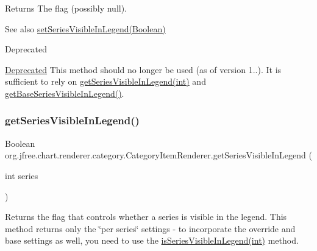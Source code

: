 \begin{DoxyReturn}{Returns}
The flag (possibly {\ttfamily null}).
\end{DoxyReturn}
\begin{DoxySeeAlso}{See also}
\mbox{\hyperlink{interfaceorg_1_1jfree_1_1chart_1_1renderer_1_1category_1_1_category_item_renderer_a2deadd4021ffd277afe59346746efd08}{set\+Series\+Visible\+In\+Legend(\+Boolean)}}
\end{DoxySeeAlso}
\begin{DoxyRefDesc}{Deprecated}
\item[\mbox{\hyperlink{deprecated__deprecated000156}{Deprecated}}]This method should no longer be used (as of version 1..). It is sufficient to rely on \mbox{\hyperlink{interfaceorg_1_1jfree_1_1chart_1_1renderer_1_1category_1_1_category_item_renderer_aece9d12305e2ae6e3ef96d3981574810}{get\+Series\+Visible\+In\+Legend(int)}} and \mbox{\hyperlink{interfaceorg_1_1jfree_1_1chart_1_1renderer_1_1category_1_1_category_item_renderer_a5dbb34f875d6bbd46e99e3ec0d06f27c}{get\+Base\+Series\+Visible\+In\+Legend()}}. \end{DoxyRefDesc}
\mbox{\label{interfaceorg_1_1jfree_1_1chart_1_1renderer_1_1category_1_1_category_item_renderer_aece9d12305e2ae6e3ef96d3981574810}} 
\subsubsection{\texorpdfstring{get\+Series\+Visible\+In\+Legend()}{getSeriesVisibleInLegend()}\hspace{0.1cm}{\footnotesize\ttfamily [2/2]}}
{\footnotesize\ttfamily Boolean org.\+jfree.\+chart.\+renderer.\+category.\+Category\+Item\+Renderer.\+get\+Series\+Visible\+In\+Legend (\begin{DoxyParamCaption}\item[{int}]{series }\end{DoxyParamCaption})}

Returns the flag that controls whether a series is visible in the legend. This method returns only the \char`\"{}per series\char`\"{} settings -\/ to incorporate the override and base settings as well, you need to use the \mbox{\hyperlink{interfaceorg_1_1jfree_1_1chart_1_1renderer_1_1category_1_1_category_item_renderer_a24e073dff573e5ebc13bfafc81c9bfc5}{is\+Series\+Visible\+In\+Legend(int)}} method.


